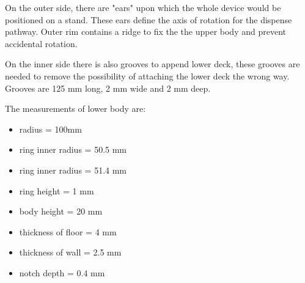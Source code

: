 On the outer side, there are "ears" upon which the whole device would be positioned on a stand. These ears define the axis of rotation for the dispense pathway. Outer rim contains a ridge to fix the the upper body and prevent accidental rotation.

On the inner side there is also grooves to append lower deck, these grooves are needed to remove the possibility of attaching the lower deck the wrong way. Grooves are 125 mm long, 2 mm wide and 2 mm deep.

The measurements of lower body are:
\begin{itemize}
	\item radius = 100mm
	\item ring inner radius = 50.5 mm
	\item ring inner radius = 51.4 mm
	\item ring height = 1 mm
	\item body height = 20 mm
	\item thickness of floor = 4 mm
	\item thickness of wall = 2.5 mm 
	\item notch depth = 0.4 mm
\end{itemize}
\newpage
